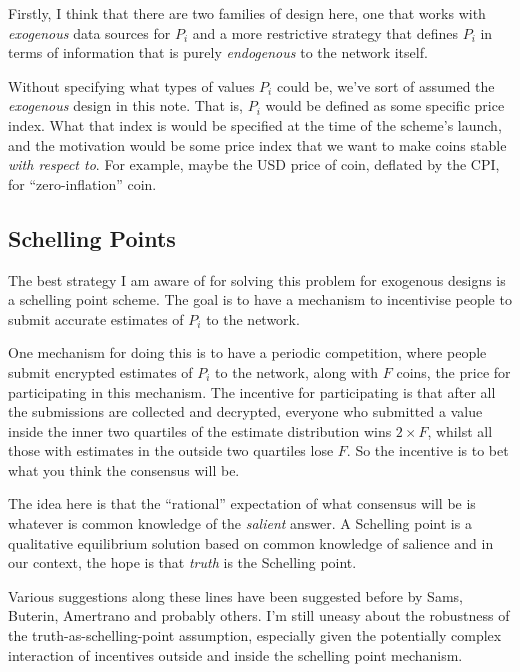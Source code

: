 \documentclass[twocolumn]{article}
\begin{document}
Firstly, I think that there are two families of design here, one that
works with \emph{exogenous} data sources for $P_{i}$ and a more
restrictive strategy that defines $P_{i}$ in terms of information that
is purely \emph{endogenous} to the network itself.

Without specifying what types of values $P_{i}$ could be, we've sort
of assumed the \emph{exogenous} design in this note. That is, $P_{i}$
would be defined as some specific price index. What that index is
would be specified at the time of the scheme's launch, and the
motivation would be some price index that we want to make coins stable
\emph{with respect to}. For example, maybe the USD price of coin,
deflated by the CPI, for ``zero-inflation'' coin. 

\subsection*{Schelling Points}
The best strategy I am aware of for solving this problem for exogenous
designs is a schelling point scheme. The goal is to have a mechanism
to incentivise people to submit accurate estimates of $P_{i}$ to the
network. 

One mechanism for doing this is to have a periodic competition, where
people submit encrypted estimates of $P_{i}$ to the network, along
with $F$ coins, the price for participating in this mechanism. The
incentive for participating is that after all the submissions are
collected and decrypted, everyone who submitted a value inside the
inner two quartiles of the estimate distribution wins $2\times F$,
whilst all those with estimates in the outside two quartiles lose
$F$. So the incentive is to bet what you think the consensus will be. 

The idea here is that the ``rational'' expectation of what consensus
will be is whatever is common knowledge of the \emph{salient}
answer. A Schelling point is a qualitative equilibrium solution based
on common knowledge of salience and in our context, the hope is that
\emph{truth} is the Schelling point.

Various suggestions along these lines have been suggested before by
Sams\cite{sams}, Buterin\cite{buterin}, Amertrano\cite{amertrano} and
probably others. I'm still uneasy about the robustness of the
truth-as-schelling-point assumption, especially given the potentially
complex interaction of incentives outside and inside the schelling
point mechanism.
\end{document}
